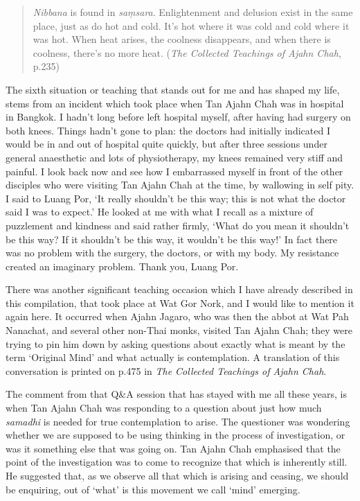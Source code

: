 \begin{quotation}
\emph{Nibbana} is found in \emph{saṃsara}. Enlightenment and delusion
exist in the same place, just as do hot and cold. It's hot where it was
cold and cold where it was hot. When heat arises, the coolness
disappears, and when there is coolness, there's no more heat.
(\emph{The Collected Teachings of Ajahn Chah}\cite{collected}, p.235)
\end{quotation}

The sixth situation or teaching that stands out for me and has shaped my
life, stems from an incident which took place when Tan Ajahn Chah was in
hospital in Bangkok. I hadn't long before left hospital myself, after
having had surgery on both knees. Things hadn't gone to plan: the
doctors had initially indicated I would be in and out of hospital quite
quickly, but after three sessions under general anaesthetic and lots of
physiotherapy, my knees remained very stiff and painful. I look back now
and see how I embarrassed myself in front of the other disciples who
were visiting Tan Ajahn Chah at the time, by wallowing in self pity. I
said to Luang Por, `It really shouldn't be this way; this is not what
the doctor said I was to expect.' He looked at me with what I recall as
a mixture of puzzlement and kindness and said rather firmly, `What do
you mean it shouldn't be this way? If it shouldn't be this way, it
wouldn't be this way!' In fact there was no problem with the surgery,
the doctors, or with my body. My resistance created an imaginary
problem. Thank you, Luang Por.

There was another significant teaching occasion which I have already
described in this compilation, that took place at Wat Gor Nork, and I
would like to mention it again here. It occurred when Ajahn Jagaro, who
was then the abbot at Wat Pah Nanachat, and several other non-Thai
monks, visited Tan Ajahn Chah; they were trying to pin him down by
asking questions about exactly what is meant by the term `Original Mind'
and what actually is contemplation. A translation of this conversation
is printed on p.475 in \emph{The Collected Teachings of Ajahn Chah}\cite{collected}.

The comment from that Q\&A
session that has stayed with me all these years, is when Tan Ajahn Chah
was responding to a question about just how much \emph{samadhi} is
needed for true contemplation to arise. The questioner was wondering
whether we are supposed to be using thinking in the process of
investigation, or was it something else that was going on. Tan Ajahn
Chah emphasised that the point of the investigation was to come to
recognize that which is inherently still. He suggested that, as we
observe all that which is arising and ceasing, we should be enquiring,
out of `what' is this movement we call `mind' emerging.

